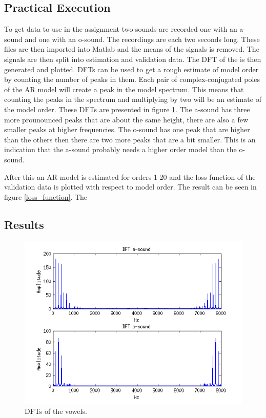 \documentclass[12pt]{article}
\begin{document}
\subsection{Practical Execution}
To get data to use in the assignment two sounds are recorded one with an a-sound and one with an o-sound.
The recordings are each two seconds long.
These files are then imported into Matlab and the means of the signals is removed.
The signals are then split into estimation and validation data.
The DFT of the is then generated and plotted.
DFTs can be used to get a rough estimate of model order by counting the number of peaks in them.
Each pair of complex-conjugated poles of the AR model will create a peak in the model spectrum.
This means that counting the peaks in the spectrum and multiplying by two will be an estimate of the model order.
These DFTs are presented in figure \ref{vowel_DFT}.
The a-sound has three more prounounced peaks that are about the same height, there are also a few smaller peaks at higher frequencies.
The o-sound has one peak that are higher than the others then there are two more peaks that are a bit smaller.
This is an indication that the a-sound probably needs a higher order model than the o-sound.

After this an AR-model is estimated for orders 1-20 and the loss function of the validation data is plotted with respect to model order.
The result can be seen in figure \ref{loss_function}.
The 


\subsection{Results}

\begin{figure}[H]
  \centering
  \includegraphics[width=14cm]{vowel_fft.png}
  \caption{
    \label{vowel_DFT}
    DFTs of the vowels.}
\end{figure}
\end{document}
